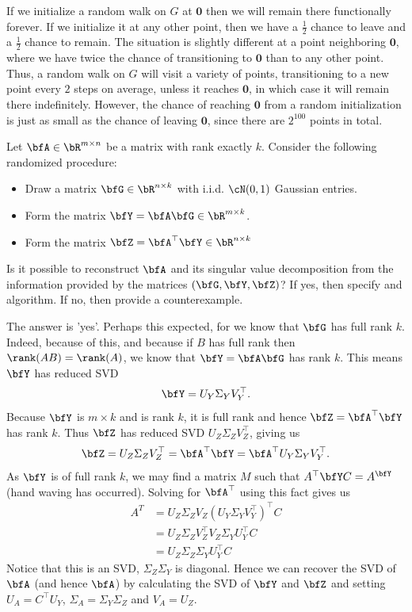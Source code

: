 \begin{homework}[e]
\begin{prf}
    If we initialize a random walk on $G$ at $\mathbf{0}$ then we will remain there functionally forever. If we initialize it at any other point, then we have a $\frac{1}{2}$ chance to leave and a $\frac{1}{2}$ chance to remain. The situation is slightly different at a point neighboring $\mathbf{0}$, where we have twice the chance of transitioning to $\mathbf{0}$ than to any other point. Thus, a random walk on $G$ will visit a variety of points, transitioning to a new point every $2$ steps on average, unless it reaches $\mathbf{0}$, in which case it will remain there indefinitely. However, the chance of reaching $\mathbf{0}$ from a random initialization is just as small as the chance of leaving $\mathbf{0}$, since there are $2^{100}$ points in total.
  \end{prf}
  \prob Let $\bfA \in \bR^{m\times n}$ be a matrix with rank exactly $k$. Consider the following randomized procedure:
  \begin{itemize}
    \item Draw a matrix $\bfG \in \bR^{n\times k}$ with i.i.d. $\cN(0,1)$ Gaussian entries.
    \item Form the matrix $\bfY = \bfA\bfG \in \bR^{m\times k}$.
    \item Form the matrix $\bfZ = \bfA^\top \bfY \in \bR^{n\times k}$
  \end{itemize}
  Is it possible to reconstruct $\bfA$ and its singular value decomposition from the information provided by the matrices $(\bfG, \bfY, \bfZ)$? If yes, then specify and algorithm. If no, then provide a counterexample.
  \begin{prf}
    The answer is 'yes'. Perhaps this expected, for we know that $\bfG$ has full rank $k$. Indeed, because of this, and because if $B$ has full rank then $\rank (AB) = \rank (A)$, we know that $\bfY = \bfA\bfG$ has rank $k$. This means $\bfY$ has reduced SVD
    \begin{align*}
      \bfY = U_Y \Sigma_Y V^\top_Y.
    \end{align*}
    Because $\bfY$ is $m\times k$ and is rank $k$, it is full rank and hence $\bfZ = \bfA^\top\bfY$ has rank $k$. Thus $\bfZ$ has reduced SVD $U_Z\Sigma_ZV^\top_Z$, giving us
    \begin{align*}
      \bfZ = U_Z\Sigma_ZV^\top_Z = \bfA^\top \bfY = \bfA^\top U_Y \Sigma_Y V^\top_Y.
    \end{align*}
    As $\bfY$ is of full rank $k$, we may find a matrix $M$ such that $A^\top \bfY C = A^\bfY$ (hand waving has occurred). Solving for $\bfA^\top$ using this fact gives us
    \begin{align*}
      A^T &= U_Z\Sigma_Z V_Z(U_Y\Sigma_Y V_Y^\top)^\top C \\
        &= U_Z\Sigma_Z V_Z^\top V_Z \Sigma_Y U_Y^\top C \\
        &= U_Z \Sigma_Z\Sigma_Y U_Y^\top C
    \end{align*}
    Notice that this is an SVD, $\Sigma_Z\Sigma_Y$ is diagonal. Hence we can recover the SVD of $\bfA$ (and hence $\bfA$) by calculating the SVD of $\bfY$ and $\bfZ$ and setting $U_A = C^\top U_Y$, $\Sigma_A = \Sigma_Y\Sigma_Z$ and $V_A = U_Z$.
  \end{prf}
\end{homework}
